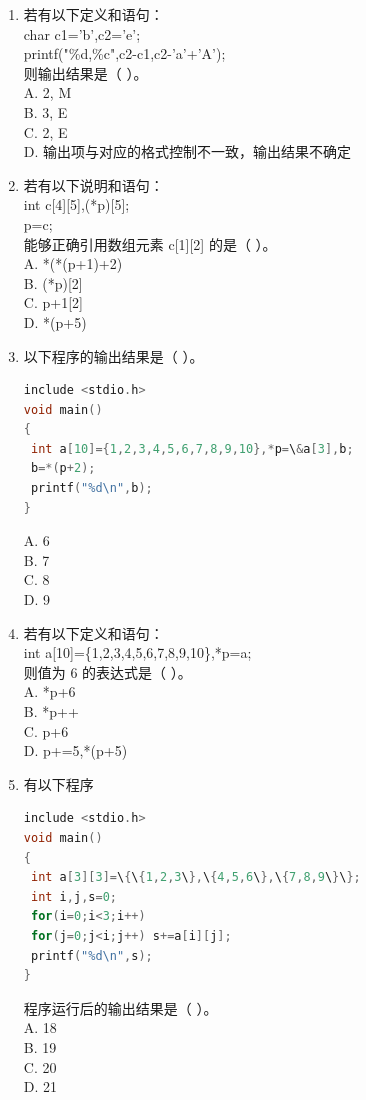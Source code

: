\documentclass[a4paper,12pt]{article}
\begin{document}
\begin{enumerate}
    \item 若有以下定义和语句：\\
    char c1='b',c2='e';\\
    printf("\%d,\%c\n",c2-c1,c2-'a'+'A');\\
    则输出结果是（ ）。\\
    A. 2, M \\
    B. 3, E \\
    C. 2, E \\
    D. 输出项与对应的格式控制不一致，输出结果不确定

    \item 若有以下说明和语句：\\
    int c[4][5],(*p)[5];\\
    p=c;\\
    能够正确引用数组元素 c[1][2] 的是（ ）。\\
    A. *(*(p+1)+2) \\
    B. (*p)[2] \\
    C. p+1[2] \\
    D. *(p+5)

    \item 以下程序的输出结果是（ ）。
    \begin{lstlisting}[language=C]
include <stdio.h>
void main()
{
 int a[10]={1,2,3,4,5,6,7,8,9,10},*p=\&a[3],b;
 b=*(p+2);
 printf("%d\n",b);
}
    \end{lstlisting}
    A. 6 \\
    B. 7 \\
    C. 8 \\
    D. 9

    \item 若有以下定义和语句：\\
    int a[10]=\{1,2,3,4,5,6,7,8,9,10\},*p=a;\\
    则值为 6 的表达式是（ ）。\\
    A. *p+6 \\
    B. *p++ \\
    C. p+6 \\
    D. p+=5,*(p+5)

    \item 有以下程序
    \begin{lstlisting}[language=C]
include <stdio.h>
void main()
{
 int a[3][3]=\{\{1,2,3\},\{4,5,6\},\{7,8,9\}\};
 int i,j,s=0;
 for(i=0;i<3;i++)
 for(j=0;j<i;j++) s+=a[i][j];
 printf("%d\n",s);
}
    \end{lstlisting}
    程序运行后的输出结果是（ ）。\\
    A. 18 \\
    B. 19 \\
    C. 20 \\
    D. 21


\end{enumerate}
\end{document}
